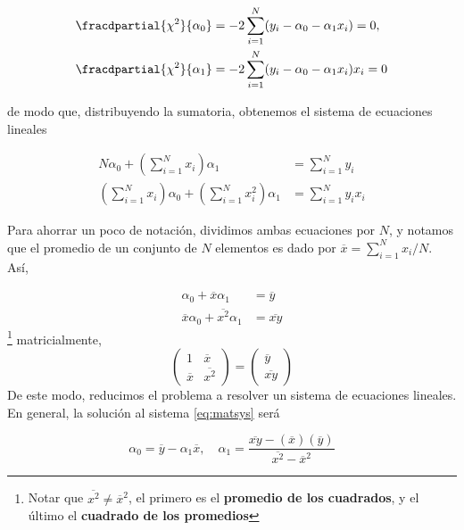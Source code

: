 \begin{align}
  \fracdpartial{\chi^{2}}{\alpha_{0}} &= -2\sum_{i=1}^{N}(y_{i} - \alpha_{0} - \alpha_{1}x_{i}) = 0, \\
  \fracdpartial{\chi^{2}}{\alpha_{1}} &= -2\sum_{i=1}^{N}(y_{i} - \alpha_{0} - \alpha_{1}x_{i})x_{i} = 0
\end{align}

de modo que, distribuyendo la sumatoria, obtenemos el sistema de ecuaciones lineales

\begin{align}
  N\alpha_{0} + \left( \sum_{i=1}^{N}x_{i} \right)\alpha_{1} &= \sum_{i=1}^{N}y_{i} \\
  \left( \sum_{i=1}^{N}x_{i} \right) \alpha_{0} + \left( \sum_{i=1}^{N}x_{i}^{2} \right)\alpha_{1} &= \sum_{i=1}^{N}y_{i}x_{i}
\end{align}

Para ahorrar un poco de notación, dividimos ambas ecuaciones por $N$, y notamos que el promedio de un conjunto de $N$ elementos es dado por $\overline{x} = \sum_{i=1}^{N}x_{i}/N$. Así,

\begin{align}
  \alpha_{0} + \overline{x}\alpha_{1} &= \overline{y} \\
  \overline{x}\alpha_{0} + \overline{x^{2}}\alpha_{1} &= \overline{xy}
\end{align}\footnote{Notar que $\overline{x^{2}} \neq \overline{x}^{2}$, el primero es el \textbf{promedio de los cuadrados}, y el último el \textbf{cuadrado de los promedios}}
matricialmente,
\begin{equation} \label{eq:matsys}
  \begin{pmatrix}
    1 &  \overline{x} \\
    \overline{x} & \overline{x^{2}}
  \end{pmatrix}
  = 
  \begin{pmatrix}
    \overline{y} \\
    \overline{xy}
  \end{pmatrix}
 \end{equation}
De este modo, reducimos el problema a resolver un sistema de ecuaciones lineales. En general, la solución al sistema \eqref{eq:matsys} será

\begin{equation}
  \alpha_{0} = \overline{y} - \alpha_{1}\overline{x}, \quad \alpha_{1} = \frac{\overline{xy} - (\overline{x})(\overline{y})}{\overline{x^{2}} - \overline{x}^{2}}
 \end{equation}

